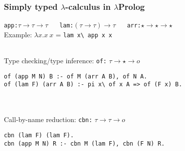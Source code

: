 \documentclass{beamer}
\newcommand{\bs}{\textbackslash\,}
\begin{document}
\begin{frame}[fragile]
 \frametitle{Simply typed $\lambda$-calculus in $\lambda$Prolog}
\texttt{app:}$\tau \to \tau \to \tau$
$\quad$
\texttt{lam:}$(\tau \to \tau) \to \tau$
$\quad$
\texttt{arr:}$\star \to \star \to \star$\\
Example: $\lambda x.x~x$ = \texttt{lam x\bs app x x}

~\\

Type checking/type inference: \texttt{of:} $\tau \to \star \to o$
\begin{verbatim}
of (app M N) B :- of M (arr A B), of N A.
of (lam F) (arr A B) :- pi x\ of x A => of (F x) B.
\end{verbatim}\\

~\\

Call-by-name reduction: \texttt{cbn:} $\tau \to \tau \to o$
\begin{verbatim}
cbn (lam F) (lam F).
cbn (app M N) R :- cbn M (lam F), cbn (F N) R.
\end{verbatim}
\end{frame}
\end{document}
